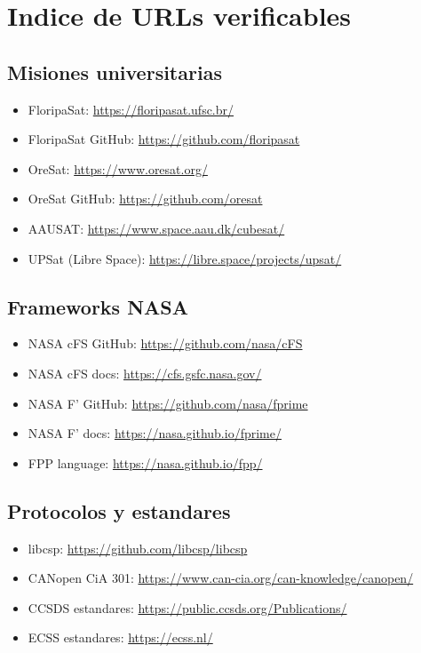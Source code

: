 \documentclass[11pt,a4paper,oneside,openright]{book}
\begin{document}
\chapter{Indice de URLs verificables}

\section{Misiones universitarias}

\begin{itemize}[leftmargin=2em]
  \item FloripaSat: \url{https://floripasat.ufsc.br/}
  \item FloripaSat GitHub: \url{https://github.com/floripasat}
  \item OreSat: \url{https://www.oresat.org/}
  \item OreSat GitHub: \url{https://github.com/oresat}
  \item AAUSAT: \url{https://www.space.aau.dk/cubesat/}
  \item UPSat (Libre Space): \url{https://libre.space/projects/upsat/}
\end{itemize}

\section{Frameworks NASA}

\begin{itemize}[leftmargin=2em]
  \item NASA cFS GitHub: \url{https://github.com/nasa/cFS}
  \item NASA cFS docs: \url{https://cfs.gsfc.nasa.gov/}
  \item NASA F' GitHub: \url{https://github.com/nasa/fprime}
  \item NASA F' docs: \url{https://nasa.github.io/fprime/}
  \item FPP language: \url{https://nasa.github.io/fpp/}
\end{itemize}

\section{Protocolos y estandares}

\begin{itemize}[leftmargin=2em]
  \item libcsp: \url{https://github.com/libcsp/libcsp}
  \item CANopen CiA 301: \url{https://www.can-cia.org/can-knowledge/canopen/}
  \item CCSDS estandares: \url{https://public.ccsds.org/Publications/}
  \item ECSS estandares: \url{https://ecss.nl/}
\end{itemize}
\end{document}
